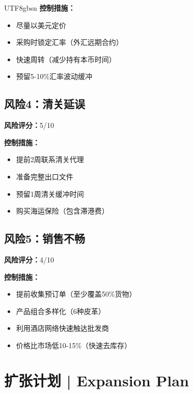 \documentclass[12pt,a4paper]{article}
\begin{document}
\begin{CJK}{UTF8}{gbsn}
\textbf{控制措施：}
\begin{itemize}
    \item 尽量以美元定价
    \item 采购时锁定汇率（外汇远期合约）
    \item 快速周转（减少持有本币时间）
    \item 预留5-10\%汇率波动缓冲
\end{itemize}

\subsection{风险4：清关延误}

\textbf{风险评分：}5/10

\textbf{控制措施：}
\begin{itemize}
    \item 提前2周联系清关代理
    \item 准备完整出口文件
    \item 预留1周清关缓冲时间
    \item 购买海运保险（包含滞港费）
\end{itemize}

\subsection{风险5：销售不畅}

\textbf{风险评分：}4/10

\textbf{控制措施：}
\begin{itemize}
    \item 提前收集预订单（至少覆盖50\%货物）
    \item 产品组合多样化（6种皮革）
    \item 利用酒店网络快速触达批发商
    \item 价格比市场低10-15\%（快速去库存）
\end{itemize}

\end{CJK}

\newpage

\section{扩张计划 | Expansion Plan}
\end{document}
